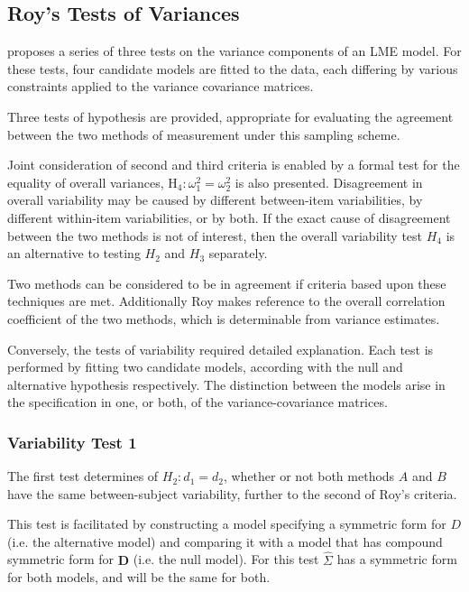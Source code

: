 \documentclass[12pt, a4paper]{report}
\theoremstyle{plain}
\theoremstyle{definition}
\theoremstyle{remark}
\begin{document}
	
	
	\subsection{Roy's Tests of Variances}
	

	\citet{ARoy2009} proposes a series of three tests on the variance components of an LME model. For these tests, four candidate models are fitted to the data, each differing by various constraints applied to the variance covariance matrices.
	

	Three tests of hypothesis are provided, appropriate for evaluating the agreement between the two methods of measurement under this sampling scheme.
	
Joint consideration of second and third criteria is enabled by a formal test for the equality of overall variances, $\operatorname{H_4} : \omega^2_1 = \omega^2_2$ is also presented. Disagreement in overall variability may be caused by different between-item variabilities, by different within-item variabilities, or by both.  If the exact cause of disagreement between the two methods is not of interest, then the overall variability test $H_4$ is an alternative to testing $H_2$ and $H_3$ separately.

	Two methods can be considered to be in agreement if criteria based upon these techniques are met. Additionally Roy makes reference to the overall correlation coefficient of the two methods, which is determinable from variance estimates.

Conversely, the tests of variability required detailed explanation. Each test is performed by fitting two candidate models, according with the null and alternative hypothesis respectively. The distinction between the models arise in the specification in one, or both, of the variance-covariance matrices. %

	\subsubsection{Variability Test 1}
	The first test determines of $H_{2}: d_{1}  = d_{2}$, whether or not both methods $A$ and $B$ have the same between-subject variability, further to the second of Roy's criteria.
	
	This test is facilitated by constructing a model specifying a symmetric form for $D$ (i.e. the alternative model) and comparing it with a model that has compound symmetric form for $\boldsymbol{D}$ (i.e. the null model). For this test ${\hat{\Sigma}}$ has a symmetric form for both models, and will be the same for both.
	
\end{document}
